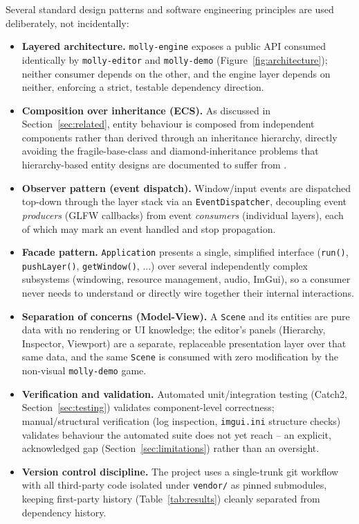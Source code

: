 \documentclass[conference]{IEEEtran}
\begin{document}
Several standard design patterns and software engineering principles
are used deliberately, not incidentally:

\begin{itemize}
    \item \textbf{Layered architecture.} \texttt{molly-engine} exposes a
          public API consumed identically by \texttt{molly-editor} and
          \texttt{molly-demo} (Figure~\ref{fig:architecture}); neither
          consumer depends on the other, and the engine layer depends on
          neither, enforcing a strict, testable dependency direction.
    \item \textbf{Composition over inheritance (ECS).} As discussed in
          Section~\ref{sec:related}, entity behaviour is composed from
          independent components rather than derived through an
          inheritance hierarchy, directly avoiding the fragile-base-class
          and diamond-inheritance problems that hierarchy-based entity
          designs are documented to suffer from \cite{west-evolve}.
    \item \textbf{Observer pattern (event dispatch).} Window/input
          events are dispatched top-down through the layer stack via an
          \texttt{EventDispatcher}, decoupling event \emph{producers}
          (GLFW callbacks) from event \emph{consumers} (individual
          layers), each of which may mark an event handled and stop
          propagation.
    \item \textbf{Facade pattern.} \texttt{Application} presents a
          single, simplified interface (\texttt{run()},
          \texttt{pushLayer()}, \texttt{getWindow()}, ...) over several
          independently complex subsystems (windowing, resource
          management, audio, ImGui), so a consumer never needs to
          understand or directly wire together their internal
          interactions.
    \item \textbf{Separation of concerns (Model-View).} A \texttt{Scene}
          and its entities are pure data with no rendering or UI
          knowledge; the editor's panels (Hierarchy, Inspector, Viewport)
          are a separate, replaceable presentation layer over that same
          data, and the same \texttt{Scene} is consumed with zero
          modification by the non-visual \texttt{molly-demo} game.
    \item \textbf{Verification and validation.} Automated unit/integration
          testing (Catch2, Section~\ref{sec:testing}) validates
          component-level correctness; manual/structural verification
          (log inspection, \texttt{imgui.ini} structure checks) validates
          behaviour the automated suite does not yet reach -- an
          explicit, acknowledged gap (Section~\ref{sec:limitations})
          rather than an oversight.
    \item \textbf{Version control discipline.} The project uses a
          single-trunk git workflow with all third-party code isolated
          under \texttt{vendor/} as pinned submodules, keeping first-party
          history (Table~\ref{tab:results}) cleanly separated from
          dependency history.
\end{itemize}
\end{document}
